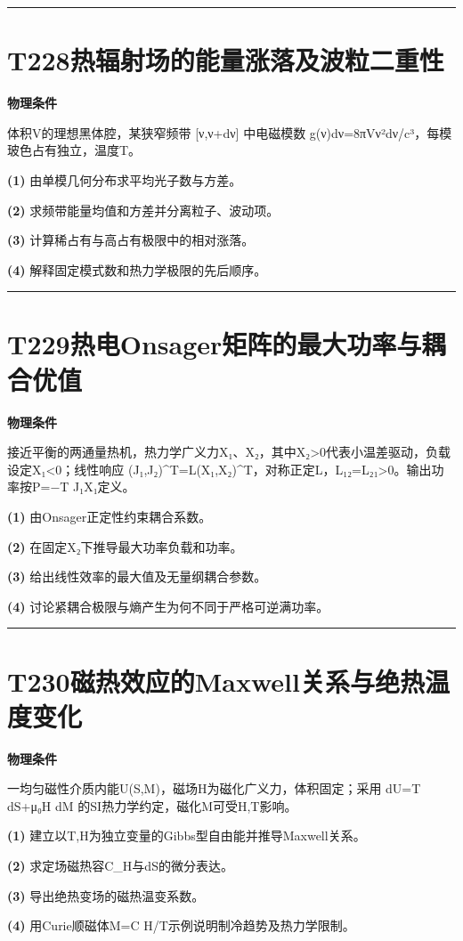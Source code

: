 \documentclass[UTF8,a4paper,11pt,oneside,openany]{ctexbook}
\begin{document}
\par\bigskip\hrule\bigskip
\section*{T228\quad 热辐射场的能量涨落及波粒二重性}
\textbf{物理条件}\par 体积V的理想黑体腔，某狭窄频带 [ν,ν+dν] 中电磁模数 g(ν)dν=8πVν²dν/c³，每模玻色占有独立，温度T。
\par\noindent\textbf{(1)} 由单模几何分布求平均光子数与方差。
\par\noindent\textbf{(2)} 求频带能量均值和方差并分离粒子、波动项。
\par\noindent\textbf{(3)} 计算稀占有与高占有极限中的相对涨落。
\par\noindent\textbf{(4)} 解释固定模式数和热力学极限的先后顺序。

\par\bigskip\hrule\bigskip
\section*{T229\quad 热电Onsager矩阵的最大功率与耦合优值}
\textbf{物理条件}\par 接近平衡的两通量热机，热力学广义力X₁、X₂，其中X₂>0代表小温差驱动，负载设定X₁<0；线性响应 (J₁,J₂)\textasciicircum{}T=L(X₁,X₂)\textasciicircum{}T，对称正定L，L₁₂=L₂₁>0。输出功率按P=−T J₁X₁定义。
\par\noindent\textbf{(1)} 由Onsager正定性约束耦合系数。
\par\noindent\textbf{(2)} 在固定X₂下推导最大功率负载和功率。
\par\noindent\textbf{(3)} 给出线性效率的最大值及无量纲耦合参数。
\par\noindent\textbf{(4)} 讨论紧耦合极限与熵产生为何不同于严格可逆满功率。

\par\bigskip\hrule\bigskip
\section*{T230\quad 磁热效应的Maxwell关系与绝热温度变化}
\textbf{物理条件}\par 一均匀磁性介质内能U(S,M)，磁场H为磁化广义力，体积固定；采用 dU=T dS+μ₀H dM 的SI热力学约定，磁化M可受H,T影响。
\par\noindent\textbf{(1)} 建立以T,H为独立变量的Gibbs型自由能并推导Maxwell关系。
\par\noindent\textbf{(2)} 求定场磁热容C\_H与dS的微分表达。
\par\noindent\textbf{(3)} 导出绝热变场的磁热温变系数。
\par\noindent\textbf{(4)} 用Curie顺磁体M=C H/T示例说明制冷趋势及热力学限制。
\end{document}
